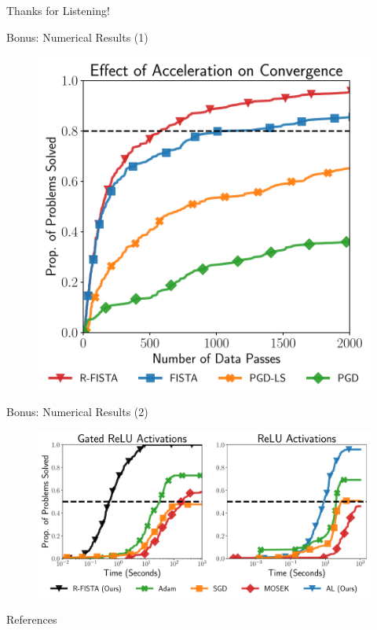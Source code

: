 \documentclass[usenames,dvipsnames,mathserif,notheorems]{beamer}
\begin{document}


\begin{frame}{}
	\begin{center}
		\huge Thanks for Listening!
	\end{center}
\end{frame}

\begin{frame}{Bonus: Numerical Results (1)}
	\begin{figure}[t]
		\centering
		\includegraphics[width=0.75\linewidth]{figures/pp_acceleration.pdf}
	\end{figure}
\end{frame}

\begin{frame}{Bonus: Numerical Results (2)}
	\begin{figure}[t]
		\centering
		\includegraphics[width=1\linewidth]{figures/pp_main.pdf}
	\end{figure}
\end{frame}

\begin{frame}[allowframebreaks]{References}
	\printbibliography[]
\end{frame}
\end{document}
